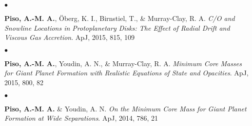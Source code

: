 \documentclass[margin,line]{res}
\newenvironment{list1}{
  \begin{list}{\ding{113}}{%
      \setlength{\itemsep}{0in}
      \setlength{\parsep}{0in} \setlength{\parskip}{0in}
      \setlength{\topsep}{0in} \setlength{\partopsep}{0in} 
      \setlength{\leftmargin}{0.17in}}}{\end{list}}
\newenvironment{list2}{
  \begin{list}{$\bullet$}{%
      \setlength{\itemsep}{0in}
      \setlength{\parsep}{0in} \setlength{\parskip}{0in}
      \setlength{\topsep}{0in} \setlength{\partopsep}{0in} 
      \setlength{\leftmargin}{0.2in}}}{\end{list}}
\begin{document}
\begin{resume}
\begin{list2}
\item[] {\bf Piso, A.-M. A.}, \"Oberg, K. I., Birnstiel, T., \& Murray-Clay, R. A. \textit{C/O and Snowline Locations in Protoplanetary Disks: The Effect of Radial Drift and Viscous Gas Accretion}. ApJ, 2015, 815, 109 \\
\end{list2}

\begin{list2}
\item[] {\bf Piso, A.-M. A.}, Youdin, A. N., \& Murray-Clay, R. A. \textit{Minimum Core Masses for Giant Planet Formation with Realistic Equations of State and Opacities}. ApJ, 2015, 800, 82 \\
\end{list2}

\begin{list2}
\item[] {\bf Piso, A.-M. A.} \& Youdin, A. N. \textit{On the Minimum Core Mass for Giant Planet Formation at Wide Separations}. ApJ, 2014, 786, 21 \\
\end{list2}










%


\end{resume}
\end{document}

